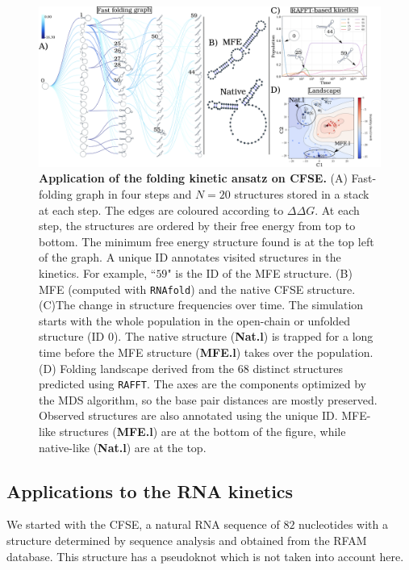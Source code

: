 \begin{figure}[t!]
	\centering
	\includegraphics[width=1.\linewidth]{../res/images/rafft/test_case.png}
	\caption{\label{test_case}\textbf{Application of the folding kinetic ansatz on CFSE.}  (A) Fast-folding graph in four steps and $N=20$ structures stored in a stack at each step. The edges are coloured according to \(\Delta \Delta G\). At each step, the structures are ordered by their free energy from top to bottom. The minimum free energy structure found is at the top left of the graph. A unique ID annotates visited structures in the kinetics. For example, ``$59$" is the ID of the MFE structure. (B) MFE (computed with \texttt{RNAfold}) and the native CFSE structure. (C)The change in structure frequencies over time. The simulation starts with the whole population in the open-chain or unfolded structure (ID 0). The native structure (\textbf{Nat.l}) is trapped for a long time before the MFE structure (\textbf{MFE.l}) takes over the population. (D) Folding landscape derived from the $68$ distinct structures predicted using \texttt{RAFFT}. The axes are the components optimized by the MDS algorithm, so the base pair distances are mostly preserved. Observed structures are also annotated using the unique ID. MFE-like structures (\textbf{MFE.l}) are at the bottom of the figure, while native-like (\textbf{Nat.l}) are at the top.}
\end{figure}
\subsection{Applications to the RNA kinetics}
We started with the CFSE, a natural RNA sequence of $82$ nucleotides with a structure determined by sequence analysis and obtained from the RFAM database. This structure has a pseudoknot which is not taken into account here.


